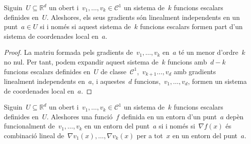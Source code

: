 \documentclass[../../main.tex]{subfiles}
\begin{document}
    \begin{proposition}
        Siguin~\(U\subseteq\mathbb{R}^{d}\) un obert i~\(v_{1},\dots,v_{k}\in\mathcal{C}^{1}\) un sistema de~\(k\) funcions escalars definides en~\(U\).
        Aleshores, els seus gradients són linealment independents en un punt~\(a\in U\) si i només si aquest sistema de~\(k\) funcions escalars formen part d'un sistema de coordenades local en~\(a\).
        \begin{proof}
            La matriu formada pels gradients de~\(v_{1},\dots,v_{k}\) en~\(a\) té un menor d'ordre~\(k\) no nul.
            Per tant, podem expandir aquest sistema de~\(k\) funcions amb~\(d-k\) funcions escalars definides en~\(U\) de classe~\(\mathcal{C}^{1}\),~\(v_{k+1}\dots,v_{d}\) amb gradients linealment independents en~\(a\), i aquestes~\(d\) funcions,~\(v_{1},\dots,v_{d}\), formen un sistema de coordenades local en~\(a\).
        \end{proof}
    \end{proposition}
    \begin{corollary}\label{corollary:dependència funcional iff dependència lineal dels gradients}
        Siguin~\(U\subseteq\mathbb{R}^{d}\) un obert i~\(v_{1},\dots,v_{k}\in\mathcal{C}^{1}\) un sistema de~\(k\) funcions escalars definides en~\(U\).
        Aleshores una funció~\(f\) definida en un entorn d'un punt~\(a\) depèn funcionalment de~\(v_{1},\dots,v_{k}\) en un entorn del punt~\(a\) si i només si~\(\nabla f(x)\) és combinació lineal de~\(\nabla v_{1}(x),\dots,\nabla v_{k}(x)\) per a tot~\(x\) en un entorn del punt~\(a\).
    \end{corollary}
\end{document}
